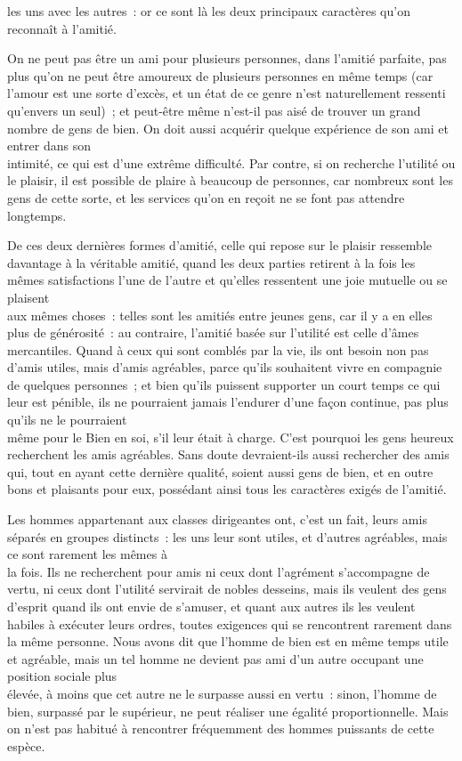 \documentclass[french,twoside]{book} %
\begin{document}
les uns avec les autres : or ce sont là les deux principaux caractères qu’on reconnaît à l’amitié.\par
On ne peut pas être un ami pour plusieurs personnes, dans l’amitié parfaite, pas plus qu’on ne peut être amoureux de plusieurs personnes en même temps (car l’amour est une sorte d’excès, et un état de ce genre n’est naturellement ressenti qu’envers un seul) ; et peut-être même n’est-il pas aisé de trouver un grand nombre de gens de bien. On doit aussi acquérir quelque expérience de son ami et entrer dans son \\
intimité, ce qui est d’une extrême difficulté. Par contre, si on recherche l’utilité ou le plaisir, il est possible de plaire à beaucoup de personnes, car nombreux sont les gens de cette sorte, et les services qu’on en reçoit ne se font pas attendre longtemps.\par
De ces deux dernières formes d’amitié, celle qui repose sur le plaisir ressemble davantage à la véritable amitié, quand les deux parties retirent à la fois les mêmes satisfactions l’une de l’autre et qu’elles ressentent une joie mutuelle ou se plaisent \\
aux mêmes choses : telles sont les amitiés entre jeunes gens, car il y a en elles plus de générosité : au contraire, l’amitié basée sur l’utilité est celle d’âmes mercantiles. Quand à ceux qui sont comblés par la vie, ils ont besoin non pas d’amis utiles, mais d’amis agréables, parce qu’ils souhaitent vivre en compagnie de quelques personnes ; et bien qu’ils puissent supporter un court temps ce qui leur est pénible, ils ne pourraient jamais l’endurer d’une façon continue, pas plus qu’ils ne le pourraient \\
même pour le Bien en soi, s’il leur était à charge. C’est pourquoi les gens heureux recherchent les amis agréables. Sans doute devraient-ils aussi rechercher des amis qui, tout en ayant cette dernière qualité, soient aussi gens de bien, et en outre bons et plaisants pour eux, possédant ainsi tous les caractères exigés de l’amitié.\par
Les hommes appartenant aux classes dirigeantes ont, c’est un fait, leurs amis séparés en groupes distincts : les uns leur sont utiles, et d’autres agréables, mais ce sont rarement les mêmes à \\
la fois. Ils ne recherchent pour amis ni ceux dont l’agrément s’accompagne de vertu, ni ceux dont l’utilité servirait de nobles desseins, mais ils veulent des gens d’esprit quand ils ont envie de s’amuser, et quant aux autres ils les veulent habiles à exécuter leurs ordres, toutes exigences qui se rencontrent rarement dans la même personne. Nous avons dit que l’homme de bien est en même temps utile et agréable, mais un tel homme ne devient pas ami d’un autre occupant une position sociale plus \\
élevée, à moins que cet autre ne le surpasse aussi en vertu : sinon, l’homme de bien, surpassé par le supérieur, ne peut réaliser une égalité proportionnelle. Mais on n’est pas habitué à rencontrer fréquemment des hommes puissants de cette espèce.
\end{document}
